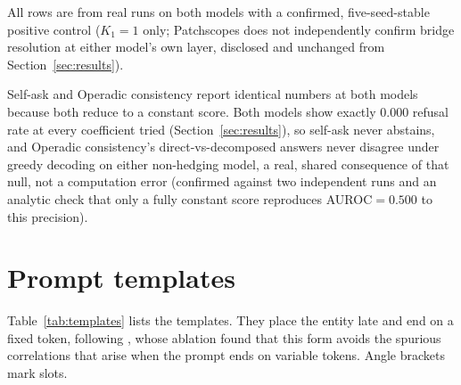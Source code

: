 \documentclass{article}
\newif\ifredflags
\newcommand{\rf}[1]{\ifredflags{\textcolor{red}{\textbf{[MISSING: #1]}}}\fi}
\newcommand{\rv}[1]{\ifredflags{\textcolor{red}{\textbf{[VERIFY: #1]}}}\fi}
\begin{document}
\begin{center}
\vspace{1pt}
{\footnotesize All rows are from real runs on both models with a confirmed, five-seed-stable positive
control ($K_1{=}1$ only; Patchscopes does not independently confirm bridge resolution at either
model's own layer, disclosed and unchanged from Section~\ref{sec:results}).
\rf{this table on the three models WITHOUT a confirmed positive control (Gemma 2 2B, Llama 3.1 8B,
Qwen3 32B) -- not because the suite was never run on them, but because an exhaustive per-layer,
five-seed search found no layer at which any of the three clears the pre-registered agreement bar
(Section~\ref{sec:res-e0}). Reporting BGR/bridge-only numbers for those models would be reporting a
selector against an instrument known not to work.}
\rf{a multiplicity correction across the thirteen baselines. ``Best in tier'' and ``beats all but
one'' are selections over many comparisons and no correction is applied anywhere; the one specified in
the setup was across relation types, of which there is one.} Self-ask and Operadic consistency report
identical numbers at both models because both reduce to a constant score. \rv{\citet{bottman2026operadic}
evaluate operadic consistency over sampled decompositions and compare it against sample-based
self-consistency at matched call budget, whereas our run compares a single greedy direct answer against
a single greedy decomposed answer, which cannot vary. Re-run it with the sampling protocol of the
original paper or state in the table that the baseline is run outside its intended regime.} Both models
show exactly $0.000$ refusal rate at every coefficient tried (Section~\ref{sec:results}), so self-ask
never abstains, and Operadic consistency's direct-vs-decomposed answers never disagree under greedy
decoding on either non-hedging model, a real, shared consequence of that null, not a computation error
(confirmed against two independent runs and an analytic check that only a fully constant score
reproduces AUROC$=0.500$ to this precision).}
\vspace{-1.9em}
\end{center}

\section{Prompt templates}
\label{app:prompts}

Table~\ref{tab:templates} lists the templates. They place the entity late and end on a fixed token, following \citet{tamoyan2025factual}, whose
ablation found that this form avoids the spurious correlations that arise when the prompt ends on
variable tokens. Angle brackets mark slots.
\end{document}
